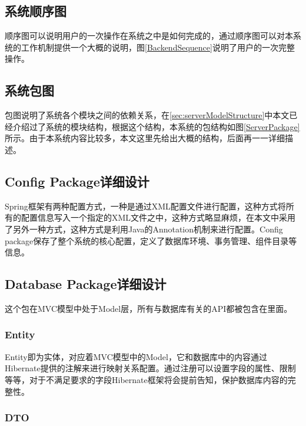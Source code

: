 \subsection{系统顺序图}
顺序图可以说明用户的一次操作在系统之中是如何完成的，通过顺序图可以对本系统的工作机制提供一个大概的说明，图\ref{BackendSequence}说明了用户的一次完整操作。


\subsection{系统包图}
包图说明了系统各个模块之间的依赖关系，在\ref{sec:serverModelStructure}中本文已经介绍过了系统的模块结构，根据这个结构，本系统的包结构如图\ref{ServerPackage}所示。由于本系统内容比较多，本文这里先给出大概的结构，后面再一一详细描述。

\subsection{Config Package详细设计}

Spring框架有两种配置方式，一种是通过XML配置文件进行配置，这种方式将所有的配置信息写入一个指定的XML文件之中，这种方式略显麻烦，在本文中采用了另外一种方式，这种方式是利用Java的Annotation机制来进行配置。Config package保存了整个系统的核心配置，定义了数据库环境、事务管理、组件目录等信息。


\subsection{Database Package详细设计}

这个包在MVC模型中处于Model层，所有与数据库有关的API都被包含在里面。

\subsubsection{Entity}

Entity即为实体，对应着MVC模型中的Model，它和数据库中的内容通过Hibernate提供的注解来进行映射关系配置。通过注册可以设置字段的属性、限制等等，对于不满足要求的字段Hibernate框架将会提前告知，保护数据库内容的完整性。

\subsubsection{DTO}

